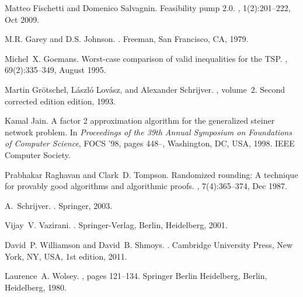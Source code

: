 \documentclass[runningheads]{llncs}
\begin{document}
\begin{thebibliography}{10}
	Matteo Fischetti and Domenico Salvagnin.
	\newblock Feasibility pump 2.0.
	, 1(2):201--222, Oct 2009.
	
	M.R. Garey and D.S. Johnson.
	.
	\newblock Freeman, San Francisco, CA, 1979.
	
	Michel~X. Goemans.
	\newblock Worst-case comparison of valid inequalities for the {TSP}.
	, 69(2):335--349, August 1995.
	
	Martin Gr{\"o}tschel, L{\'a}szl{\'o} Lov{\'a}sz, and Alexander Schrijver.
	, volume~2.
	\newblock Second corrected edition edition, 1993.
	
	Kamal Jain.
	\newblock A factor 2 approximation algorithm for the generalized steiner
	network problem.
	\newblock In {\em Proceedings of the 39th Annual Symposium on Foundations of
		Computer Science}, FOCS '98, pages 448--, Washington, DC, USA, 1998. IEEE
	Computer Society.
	
	Prabhakar Raghavan and Clark~D. Tompson.
	\newblock Randomized rounding: A technique for provably good algorithms and
	algorithmic proofs.
	, 7(4):365--374, Dec 1987.
	
	A.~Schrijver.
	.
	\newblock Springer, 2003.
	
	Vijay~V. Vazirani.
	.
	\newblock Springer-Verlag, Berlin, Heidelberg, 2001.
	
	David~P. Williamson and David~B. Shmoys.
	.
	\newblock Cambridge University Press, New York, NY, USA, 1st edition, 2011.
	
	Laurence~A. Wolsey.
	,
	pages 121--134.
	\newblock Springer Berlin Heidelberg, Berlin, Heidelberg, 1980.
	
\end{thebibliography}
\newpage
\appendix


\end{document}
